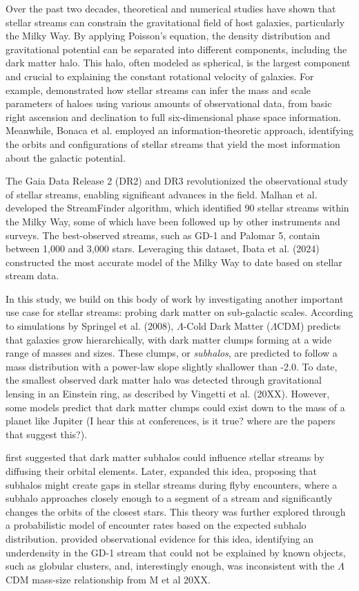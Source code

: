 \documentclass[draft]{aa}
\begin{document}
  Over the past two decades, theoretical and numerical studies have shown that stellar streams can constrain the gravitational field of host galaxies, particularly the Milky Way. By applying Poisson’s equation, the density distribution and gravitational potential can be separated into different components, including the dark matter halo. This halo, often modeled as spherical, is the largest component and crucial to explaining the constant rotational velocity of galaxies. For example, \citet{varghese2011stellar} demonstrated how stellar streams can infer the mass and scale parameters of haloes using various amounts of observational data, from basic right ascension and declination to full six-dimensional phase space information. Meanwhile, Bonaca et al. employed an information-theoretic approach, identifying the orbits and configurations of stellar streams that yield the most information about the galactic potential.

  The Gaia Data Release 2 (DR2) and DR3 revolutionized the observational study of stellar streams, enabling significant advances in the field. Malhan et al. developed the StreamFinder algorithm, which identified 90 stellar streams within the Milky Way, some of which have been followed up by other instruments and surveys. The best-observed streams, such as GD-1 and Palomar 5, contain between 1,000 and 3,000 stars. Leveraging this dataset, Ibata et al. (2024) constructed the most accurate model of the Milky Way to date based on stellar stream data.

  In this study, we build on this body of work by investigating another important use case for stellar streams: probing dark matter on sub-galactic scales. According to simulations by Springel et al. (2008), $\Lambda$-Cold Dark Matter ($\Lambda$CDM) predicts that galaxies grow hierarchically, with dark matter clumps forming at a wide range of masses and sizes. These clumps, or \textit{subhalos}, are predicted to follow a mass distribution with a power-law slope slightly shallower than -2.0. To date, the smallest observed dark matter halo was detected through gravitational lensing in an Einstein ring, as described by Vingetti et al. (20XX). However, some models predict that dark matter clumps could exist down to the mass of a planet like Jupiter (I hear this at conferences, is it true? where are the papers that suggest this?).

  \citet{rodrigo_ibata_uncovering_2002} first suggested that dark matter subhalos could influence stellar streams by diffusing their orbital elements. Later, \citet{r_g_carlberg_pal_2012} expanded this idea, proposing that subhalos might create gaps in stellar streams during flyby encounters, where a subhalo approaches closely enough to a segment of a stream and significantly changes the orbits of the closest stars. This theory was further explored through a probabilistic model of encounter rates based on the expected subhalo distribution. \citet{bonaca_spur_2018} provided observational evidence for this idea, identifying an underdensity in the GD-1 stream that could not be explained by known objects, such as globular clusters, and, interestingly enough, was inconsistent with the $\Lambda$CDM mass-size relationship from M et al 20XX.
\end{document}
